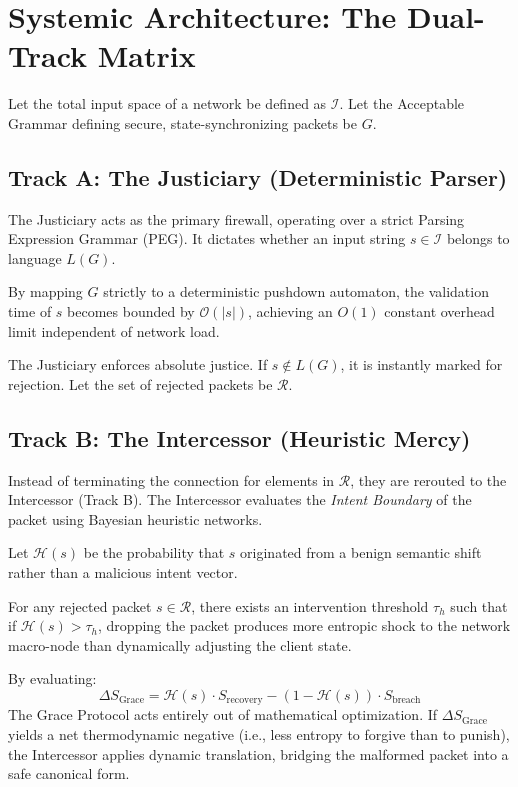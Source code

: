 \documentclass[12pt, a4paper]{article}
\begin{document}
\section{Systemic Architecture: The Dual-Track Matrix}

Let the total input space of a network be defined as $\mathcal{I}$. 
Let the Acceptable Grammar defining secure, state-synchronizing packets be $G$. 

\subsection{Track A: The Justiciary (Deterministic Parser)}
The Justiciary acts as the primary firewall, operating over a strict Parsing Expression Grammar (PEG). It dictates whether an input string $s \in \mathcal{I}$ belongs to language $L(G)$.

\begin{theorem}
By mapping $G$ strictly to a deterministic pushdown automaton, the validation time of $s$ becomes bounded by $\mathcal{O}(|s|)$, achieving an $O(1)$ constant overhead limit independent of network load.
\end{theorem}
The Justiciary enforces absolute justice. If $s \notin L(G)$, it is instantly marked for rejection. Let the set of rejected packets be $\mathcal{R}$.

\subsection{Track B: The Intercessor (Heuristic Mercy)}
Instead of terminating the connection for elements in $\mathcal{R}$, they are rerouted to the Intercessor (Track B). The Intercessor evaluates the \textit{Intent Boundary} of the packet using Bayesian heuristic networks.

Let $\mathcal{H}(s)$ be the probability that $s$ originated from a benign semantic shift rather than a malicious intent vector. 

\begin{proposition}
For any rejected packet $s \in \mathcal{R}$, there exists an intervention threshold $\tau_h$ such that if $\mathcal{H}(s) > \tau_h$, dropping the packet produces more entropic shock to the network macro-node than dynamically adjusting the client state.
\end{proposition}

By evaluating:
\begin{equation}
  \Delta S_{\text{Grace}} = \mathcal{H}(s) \cdot S_{\text{recovery}} - (1 - \mathcal{H}(s)) \cdot S_{\text{breach}}
\end{equation}
The Grace Protocol acts entirely out of mathematical optimization. If $\Delta S_{\text{Grace}}$ yields a net thermodynamic negative (i.e., less entropy to forgive than to punish), the Intercessor applies dynamic translation, bridging the malformed packet into a safe canonical form.
\end{document}
